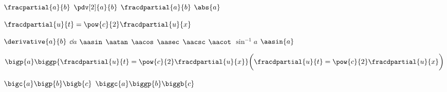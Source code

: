 $\fracpartial{a}{b}$
$\pdv[2]{a}{b}$
$\fracdpartial{a}{b}$
$\abs{a}$

$\fracdpartial{u}{t} = \pow{c}{2} \fracdpartial{u}{x}$

$\derivative{a}{b}$
$\dd{a}$ 
$\aasin$
$\aatan$
$\aacos$
$\aasec$
$\aacsc$
$\aacot$
\newp
$\sin^{-1}a$
\newp
$\aasin{a}$


$\bigp{a} \biggp{\fracdpartial{u}{t} = \pow{c}{2} \fracdpartial{u}{x}} \biggl(\fracdpartial{u}{t} = \pow{c}{2} \fracdpartial{u}{x}\biggr)$

$\bigc{a} \bigp{b} \bigb{c}$
$\biggc{a} \biggp{b} \biggb{c}$